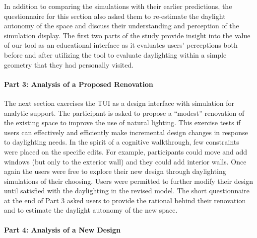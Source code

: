 In addition to comparing the simulations with their earlier
predictions, the questionnaire for this section also asked them to
re-estimate the daylight autonomy of the space and discuss their
understanding and perception of the simulation display.  The first two
parts of the study provide insight into the value of our tool as an
educational interface as it evaluates users' perceptions both before
and after utilizing the tool to evaluate daylighting within a simple
geometry that they had personally visited.







\paragraph{Part 3: Analysis of a Proposed Renovation}

The next section exercises the TUI as a design interface with
simulation for analytic support.  The participant is asked to propose
a ``modest'' renovation of the existing space to improve the use of
natural lighting.  This exercise tests if users can effectively and
efficiently make incremental design changes in response to daylighting
needs.  In the spirit of a cognitive walkthrough, few constraints were
placed on the specific edits.  For example, participants could move
and add windows (but only to the exterior wall) and they could add
interior walls.  Once again the users were free to explore their new
design through daylighting simulations of their choosing.  Users were
permitted to further modify their design until satisfied with the
daylighting in the revised model.
%
The short questionnaire at the end of Part 3 asked users to provide
the rational behind their renovation and to estimate the daylight
autonomy of the new space.  


\paragraph{Part 4: Analysis of a New Design}

